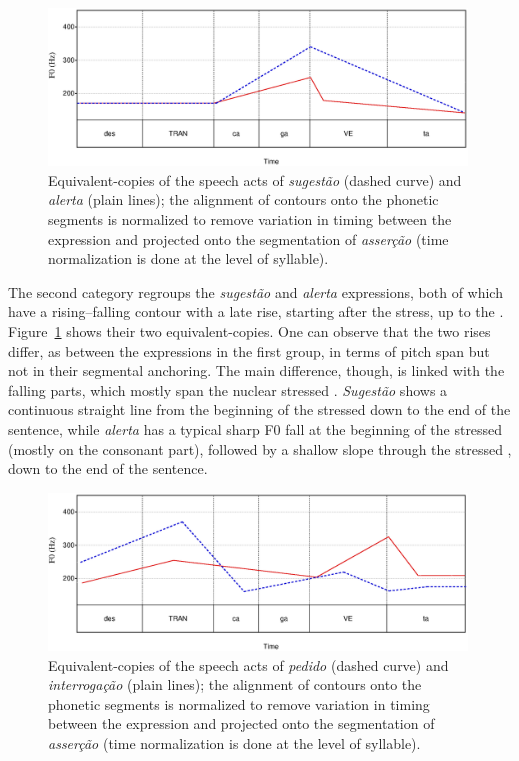 \documentclass[output=paper]{LSP/langsci}
\begin{document}
\begin{figure}[t]
\includegraphics[width=0.99\textwidth]{figures/MOR11.eps}
\caption{Equivalent-copies of the speech acts of \textit{sugestão} (dashed curve) and \textit{alerta} (plain lines); the alignment of contours onto the phonetic segments is normalized to remove variation in timing between the expression and projected onto the segmentation of \textit{asserção} (time normalization is done at the level of syllable).}
\label{figure:EC2}
\end{figure}

The second category regroups the \textit{sugestão} and \textit{alerta} expressions, both of which have a rising–falling contour with a late rise, starting after the  stress, up to the . 
Figure~\ref{figure:EC2} shows their two equivalent-copies. 
One can observe that the two rises differ, as between the expressions in the first group, in terms of pitch span but not in their segmental anchoring. 
The main difference, though, is linked with the falling parts, which mostly span the nuclear stressed . 
\textit{Sugestão} shows a continuous straight line from the beginning of the stressed  down to the end of the sentence, while \textit{alerta} has a typical sharp F0 fall at the beginning of the stressed  (mostly on the consonant part), followed by a shallow slope through the stressed , down to the end of the sentence.


\begin{figure}

\includegraphics[width=0.99\textwidth]{figures/MOR12.eps}
\caption{Equivalent-copies of the speech acts of \textit{pedido} (dashed curve) and \textit{interrogação} (plain lines); the alignment of contours onto the phonetic segments is normalized to remove variation in timing between the expression and projected onto the segmentation of \textit{asserção} (time normalization is done at the level of syllable).}
\label{figure:EC3}
\end{figure}
\end{document}
